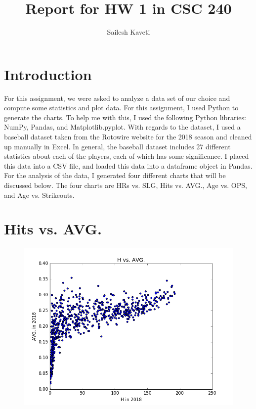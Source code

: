 \documentclass{acmart}
\title{Report for HW 1 in CSC 240}
\author{Sailesh Kaveti}
\begin{document}
\maketitle

\section*{Introduction}

For this assignment, we were asked to analyze a data set of our choice and compute some statistics and plot data. For this assignment, I used Python to generate the charts. To help me with this, I used the following Python libraries: NumPy, Pandas, and Matplotlib.pyplot. With regards to the dataset, I used a baseball dataset taken from the Rotowire website for the 2018 season and cleaned up manually in Excel. In general, the baseball dataset includes 27 different statistics about each of the players, each of which has some significance. I placed this data into a CSV file, and loaded this data into a dataframe object in Pandas. For the analysis of the data, I generated four different charts that will be discussed below. The four charts are HRs vs. SLG, Hits vs. AVG., Age vs. OPS, and Age vs. Strikeouts.

\section*{Hits vs. AVG.}

\begin{figure}[H]
\includegraphics[scale=.5]{HvsAVG.png}
\end{figure}
\end{document}
